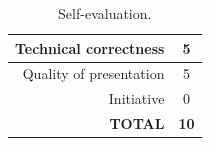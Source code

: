 \documentclass[12pt,a4paper]{article}
\begin{document}
\clearpage
\begin{table}[!htb]
	\centering
	\caption{Self-evaluation.}
	\begin{tabular}{||r|c||}
		\hline
		Technical correctness & 5 \\ \hline
		Quality of presentation & 5 \\ \hline
		Initiative & 0 \\ \hline
		\textbf{TOTAL} & \textbf{10} \\ \hline
	\end{tabular}
	\label{tab:self-eval}
\end{table}



\end{document}
